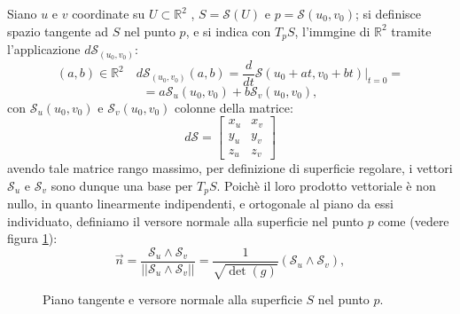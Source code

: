 Siano $u$ e $v$ coordinate su $U\subset\mathbb{R}^2$ , $S = \mathcal{S}(U)$ e $p=\mathcal{S}(u_0,v_0)$; si definisce spazio tangente ad $S$ nel punto $p$, e si indica con $T_pS$, l'immgine di $\mathbb{R}^2$ tramite l'applicazione $d\mathcal{S}_{(u_0,v_0)}$:
\[
(a,b)\in\mathbb{R}^2\quad d\mathcal{S}_{(u_0,v_0)}(a,b)= 
\frac{d}{dt}\mathcal{S}(u_0+at,v_0+bt)|_{t=0}=
\]
\[
=a\mathcal{S}_u(u_0,v_0)+b\mathcal{S}_v(u_0,v_0),
\]
con $\mathcal{S}_u(u_0,v_0)$ e $\mathcal{S}_v(u_0,v_0)$ colonne della matrice:
\[
d\mathcal{S}=
\begin{bmatrix}
  x_u & x_v \\
  y_u & y_v \\
  z_u & z_v 
\end{bmatrix}
\]
avendo tale matrice rango massimo, per definizione di superficie regolare, i vettori $\mathcal{S}_u$ e $\mathcal{S}_v$ sono dunque una base per $T_pS$. Poichè il loro prodotto vettoriale è non nullo, in quanto linearmente indipendenti, e ortogonale al piano da essi individuato, definiamo il versore normale alla superficie nel punto $p$ come (vedere figura \ref{fig:cp-111}):
\begin{equation}
  \label{eq:cp-111}
  \vec{n} = \frac{\mathcal{S}_u\wedge\mathcal{S}_v}{||\mathcal{S}_u\wedge\mathcal{S}_v||}=\frac{1}{\sqrt{\det(g)}}(\mathcal{S}_u\wedge\mathcal{S}_v),
\end{equation}
\begin{figure}[!hp]

  \caption{Piano tangente e versore normale alla superficie $S$ nel punto $p$.}
  \label{fig:cp-111}
\end{figure}
